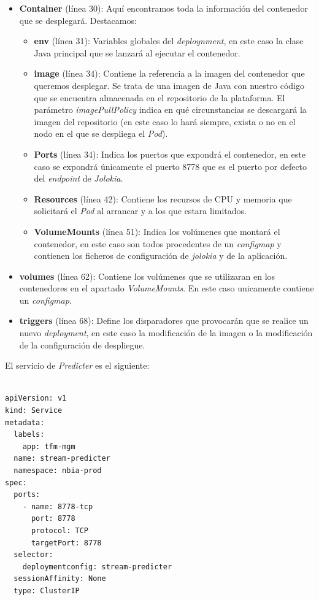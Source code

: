 \begin{itemize}
	\item \textbf{Container} (línea 30): Aquí encontramos toda la información del contenedor que se desplegará. Destacamos: 
		\begin{itemize}
			\item \textbf{env} (línea 31): Variables globales del \textit{deploynment}, en este caso la clase Java  principal que se lanzará al ejecutar el contenedor. 
			\item \textbf{image} (línea 34): Contiene la referencia a la imagen del contenedor que queremos desplegar. Se trata de una imagen de Java con nuestro código que se encuentra almacenada en el repositorio de la plataforma. El parámetro \textit{imagePullPolicy} indica en qué circunstancias se descargará la imagen del repositorio (en este caso lo hará siempre, exista o no en el nodo en el que se despliega el \textit{Pod}).
			\item \textbf{Ports} (línea 34): Indica los puertos que expondrá el contenedor, en este caso se expondrá únicamente el puerto 8778 que es el puerto por defecto del \textit{endpoint} de \textit{Jolokia}.
			\item \textbf{Resources} (línea 42): Contiene los recursos de CPU y memoria que solicitará el \textit{Pod}  al arrancar y a los que estara limitados. 
			\item \textbf{VolumeMounts} (línea 51): Indica los volúmenes que montará el contenedor, en este caso son todos procedentes de un \textit{configmap} y contienen los ficheros de configuración de \textit{jolokia} y de la aplicación.
		\end{itemize}
	\item  \textbf{volumes} (línea 62): Contiene los volúmenes que se utilizaran en los contenedores en el apartado \textit{VolumeMounts}. En este caso unicamente contiene un \textit{configmap}. 
	\item \textbf{triggers} (línea 68): Define los disparadores que provocarán que se realice un nuevo \textit{deployment}, en este caso la modificación de la imagen o la modificación de la configuración de despliegue.

\end{itemize}


El servicio de \textit{Predicter} es el siguiente: 

\begin{verbatim}

apiVersion: v1
kind: Service
metadata:
  labels:
    app: tfm-mgm
  name: stream-predicter
  namespace: nbia-prod
spec:
  ports:
    - name: 8778-tcp
      port: 8778
      protocol: TCP
      targetPort: 8778
  selector:
    deploymentconfig: stream-predicter
  sessionAffinity: None
  type: ClusterIP

\end{verbatim}

